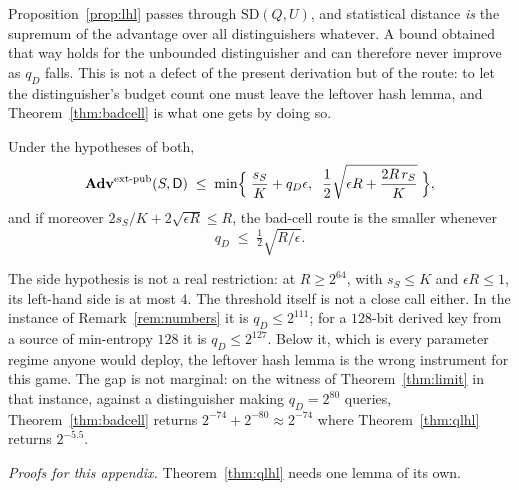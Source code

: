 \documentclass{aicr-solution}
\newcommand{\Adv}{\mathbf{Adv}}
\newcommand{\extp}{\mathrm{ext}\text{-}\mathrm{pub}}
\newcommand{\SD}{\mathrm{SD}}
\begin{document}
\begin{remark}\label{rem:qd}
Proposition~\ref{prop:lhl} passes through $\SD(Q,U)$, and statistical distance \emph{is} the
supremum of the advantage over all distinguishers whatever. A bound obtained that way holds for the
unbounded distinguisher and can therefore never improve as $q_D$ falls. This is not a defect of the
present derivation but of the route: to let the distinguisher's budget count one must leave the
leftover hash lemma, and Theorem~\ref{thm:badcell} is what one gets by doing so.
\end{remark}
\begin{corollary}\label{cor:which}
Under the hypotheses of both,
\[
  \Adv^{\extp}(S,\mathsf{D}) \;\le\;
  \min\Bigl\{\; \frac{s_S}{K} + q_D\epsilon , \;\;
    \frac12\sqrt{\epsilon R + \frac{2R\,r_S}{K}} \;\Bigr\} ,
\]
and if moreover $2s_S/K + 2\sqrt{\epsilon R} \le R$, the bad-cell route is the smaller whenever
\[
  q_D \;\le\; \tfrac12\sqrt{R/\epsilon} .
\]
\end{corollary}

The side hypothesis is not a real restriction: at $R \ge 2^{64}$, with $s_S \le K$ and
$\epsilon R \le 1$, its left-hand side is at most $4$. The threshold itself is not a close call
either. In the instance of Remark~\ref{rem:numbers} it is
$q_D \le 2^{111}$; for a $128$-bit derived key from a source of min-entropy $128$ it is
$q_D \le 2^{127}$. Below it, which is every parameter regime anyone would deploy, the leftover hash
lemma is the wrong instrument for this game. The gap is not marginal: on the witness of Theorem~\ref{thm:limit} in that instance, against a distinguisher making
$q_D = 2^{80}$ queries, Theorem~\ref{thm:badcell} returns $2^{-74} + 2^{-80} \approx 2^{-74}$ where
Theorem~\ref{thm:qlhl} returns $2^{-5.5}$.

\medskip\noindent\emph{Proofs for this appendix.} Theorem~\ref{thm:qlhl} needs one lemma of its own.
\end{document}
